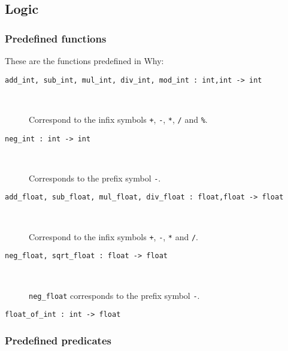\documentclass[a4paper,12pt]{report}
\newcommand{\why}{\textsf{Why}}
\begin{document}
\subsection{Logic}

\subsubsection{Predefined functions}

These are the functions predefined in \why:
\begin{description}
\item[\texttt{add\_int, sub\_int, mul\_int, div\_int, mod\_int :
    int,int -> int}] ~\par
  Correspond to the infix symbols
  \texttt{+}, \texttt{-}, \texttt{*}, \texttt{/} and \texttt{\%}.
\item[\texttt{neg\_int : int -> int}] ~\par
  Corresponds to the prefix symbol \texttt{-}.
\item[\texttt{add\_float, sub\_float, mul\_float, div\_float :
    float,float -> float}] ~\par
  Correspond to the infix symbols
  \texttt{+}, \texttt{-}, \texttt{*} and \texttt{/}.
\item[\texttt{neg\_float, sqrt\_float : float -> float}] ~\par
  \texttt{neg\_float} corresponds to the prefix symbol \texttt{-}.
\item[\texttt{float\_of\_int : int -> float}]
\end{description}

\subsubsection{Predefined predicates}
\end{document}
